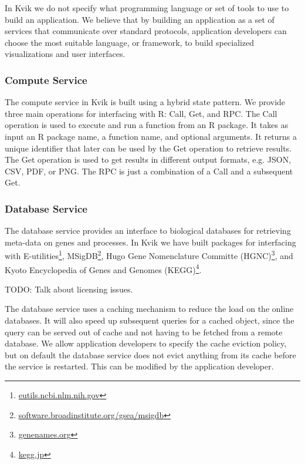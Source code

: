 In Kvik we do not specify what programming language or set of tools to use to
build an application. We believe that by building an application as a set of
services that communicate over standard protocols, application developers can
choose the most suitable language, or framework, to build specialized
visualizations and user interfaces. 

\subsubsection*{Compute Service}
The compute service in Kvik is built using a hybrid state pattern\cite{opencpu}.
We provide three main operations for interfacing with R:
Call, Get, and RPC. The Call operation is used to execute and run a function
from an R package. It takes as input an R package name, a function name, and
optional arguments. It returns a unique identifier that later can be used by the
Get operation to retrieve results. The Get operation is used to get results in
different output formats, e.g. JSON, CSV, PDF, or PNG. The RPC is just a
combination of a Call and a subsequent Get. 



\subsubsection*{Database Service} 
The database service provides an interface to biological databases for
retrieving meta-data on genes and processes. 
In Kvik we have built packages for
interfacing with
E-utilities\footnote{\url{eutils.ncbi.nlm.nih.gov}},
MSigDB\footnote{\url{software.broadinstitute.org/gsea/msigdb}}, Hugo Gene
Nomenclature Committe (HGNC)\footnote{\url{genenames.org}}, and Kyoto Encyclopedia
of Genes and Genomes (KEGG)\footnote{\url{kegg.jp}}. 

TODO: Talk about licensing issues. 

The database service uses a caching mechanism to reduce the load on the online
databases. It will also speed up subsequent queries for a cached object, since
the query can be served out of cache and not having to be fetched from a remote
database. We allow application developers to specify the cache eviction policy,
but on default the database service does not evict anything from its cache
before the service is restarted. This can be modified by the application
developer. 

